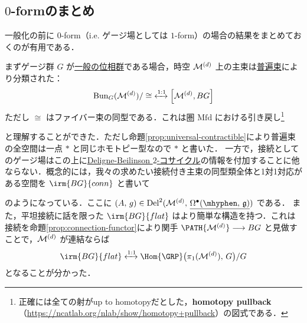 \documentclass[TQFT_main]{subfiles}
\begin{document}
\subsection{$0$-formのまとめ}

一般化の前に $0$-form（i.e. ゲージ場としては $1$-form）の場合の結果をまとめておくのが有用である．

まずゲージ群 $G$ が\underline{一般の位相群}である場合，時空 $\mathcal{M}^{(d)}$ 上の主束は\hyperref[def:universal-bundle]{普遍束}により分類された：
\begin{align}
    \label{eq:1form-univ}
    \mathrm{Bun}_G (\mfdcal{M}{d})/\cong\; \xleftrightarrow{1:1} \comm{\mfdcal{M}{d}}{BG}
\end{align}
ただし $\cong$ はファイバー束の同型である．これは圏 $\bm{\mathrm{Mfd}}$ における引き戻し\footnote{正確には全ての射がup to homotopyだとした，\textbf{homotopy pullback}（\url{https://ncatlab.org/nlab/show/homotopy+pullback}）の図式である．}
\begin{center}
\end{center}
と理解することができた．ただし命題\ref{prop:universal-contractible}により普遍束の全空間は一点 $*$ と同じホモトピー型なので $*$ と書いた．
一方で，接続としてのゲージ場はこの上に\hyperref[def:Deligne-Beilinson]{Deligne-Beilinson $2$-コサイクル}の情報を付加することに他ならない．概念的には，我々の求めたい接続付き主束の同型類全体と1対1対応がある空間を $\irm{BG}{conn}$ と書いて
\begin{center}
\end{center}
のようになっている．ここに $(A,\, g) \in \mathrm{Del}^2(\mfdcal{M}{d},\, \underline{\Omega^\bullet(\mhyphen,\, \mathfrak{g})})$ である．
また，平坦接続に話を限った $\irm{BG}{flat}$ はより簡単な構造を持つ．これは接続を命題\ref{prop:connection-functor}により関手 $\PATH{\mfdcal{M}{d}} \lto BG$ と見做すことで，$\mathcal{M}^{(d)}$ が連結ならば
\begin{align}
    \label{eq:1form-flat}
    \irm{BG}{flat} \xleftrightarrow{1:1} \Hom{\GRP} \bigl( \pi_1(\mfdcal{M}{d}),\, G \bigr) /G
\end{align}
となることが分かった．
\end{document}
